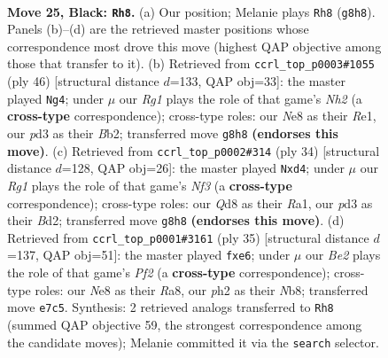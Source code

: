 \documentclass[11pt]{article}
\begin{document}
\clearpage

\begin{figure}[p]\centering
\begin{subfigure}{0.46\textwidth}\centering
\resizebox{\linewidth}{!}{%
\newchessgame
\chessboard[
  setfen={2bqn1r1/4bpk1/p5p1/n1BBp2p/P3P3/N2PQ2N/1rP1RPPP/R5K1 b - - 3 25},
  showmover=false,
  pgfstyle=straightmove, color=movearrow, markmove={g8-h8}
]}
\caption{}
\end{subfigure}\hfill
\begin{subfigure}{0.46\textwidth}\centering
\resizebox{\linewidth}{!}{%
\newchessgame
\chessboard[
  setfen={1r1nr1k1/2q2pbp/2bp2p1/Rp2p2n/1P2P3/1BP2N1P/1B3PPN/3QR1K1 w - - 4 24},
  showmover=false,
  pgfstyle=straightmove, color=movearrow, markmove={h2-g4}
]}
\caption{}
\end{subfigure}
\\[4pt]
\begin{subfigure}{0.46\textwidth}\centering
\resizebox{\linewidth}{!}{%
\newchessgame
\chessboard[
  setfen={3n1rk1/1pp2pp1/3pbq1p/7n/1PBpP3/2Q2N1P/2PB1PP1/R5K1 w - - 0 18},
  showmover=false,
  pgfstyle=straightmove, color=movearrow, markmove={f3-d4}
]}
\caption{}
\end{subfigure}\hfill
\begin{subfigure}{0.46\textwidth}\centering
\resizebox{\linewidth}{!}{%
\newchessgame
\chessboard[
  setfen={rn1q1rk1/p4pb1/4P1pp/2p4n/P1B1PP2/1p2B3/1P3P1P/RQ1N1RK1 b - - 0 18},
  showmover=false,
  pgfstyle=straightmove, color=movearrow, markmove={f7-e6}
]}
\caption{}
\end{subfigure}
\caption{\textbf{Move 25, Black: \texttt{Rh8}.} (a) Our position; Melanie plays \texttt{Rh8} (\texttt{g8h8}). Panels (b)--(d) are the retrieved master positions whose correspondence most drove this move (highest QAP objective among those that transfer to it). (b) Retrieved from \texttt{ccrl\_top\_p0003\#1055} (ply 46) [structural distance $d$=133, QAP obj=33]: the master played \texttt{Ng4}; under $\mu$ our \emph{Rg1} plays the role of that game's \emph{Nh2} (a \textbf{cross-type} correspondence); cross-type roles: our \emph{N}e8 as their \emph{R}e1, our \emph{p}d3 as their \emph{B}b2; transferred move \texttt{g8h8} \textbf{(endorses this move)}. (c) Retrieved from \texttt{ccrl\_top\_p0002\#314} (ply 34) [structural distance $d$=128, QAP obj=26]: the master played \texttt{Nxd4}; under $\mu$ our \emph{Rg1} plays the role of that game's \emph{Nf3} (a \textbf{cross-type} correspondence); cross-type roles: our \emph{Q}d8 as their \emph{R}a1, our \emph{p}d3 as their \emph{B}d2; transferred move \texttt{g8h8} \textbf{(endorses this move)}. (d) Retrieved from \texttt{ccrl\_top\_p0001\#3161} (ply 35) [structural distance $d$=137, QAP obj=51]: the master played \texttt{fxe6}; under $\mu$ our \emph{Be2} plays the role of that game's \emph{Pf2} (a \textbf{cross-type} correspondence); cross-type roles: our \emph{N}e8 as their \emph{R}a8, our \emph{p}h2 as their \emph{N}b8; transferred move \texttt{e7c5}. Synthesis: 2 retrieved analogs transferred to \texttt{Rh8} (summed QAP objective 59, the strongest correspondence among the candidate moves); Melanie committed it via the \texttt{search} selector.}
\label{fig:thought-m49}
\end{figure}
\end{document}
